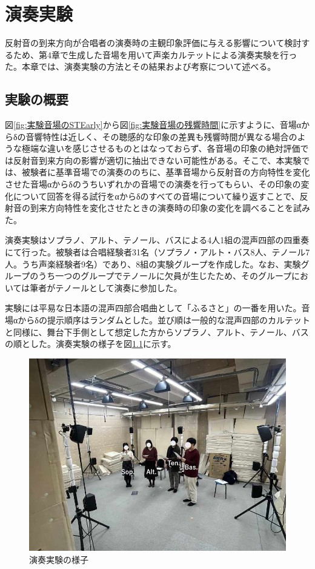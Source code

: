 \documentclass[11pt,a4j]{jreport}
\begin{document}
\chapter{演奏実験}
反射音の到来方向が合唱者の演奏時の主観印象評価に与える影響について検討するため、第4章で生成した音場を用いて声楽カルテットによる演奏実験を行った。本章では、演奏実験の方法とその結果および考察について述べる。

\section{実験の概要}
図\ref{fig:実験音場のSTEarly}から図\ref{fig:実験音場の残響時間}に示すように、音場αからδの音響特性は近しく、その聴感的な印象の差異も残響時間が異なる場合のような極端な違いを感じさせるものとはなっておらず、各音場の印象の絶対評価では反射音到来方向の影響が適切に抽出できない可能性がある。そこで、本実験では、被験者に基準音場での演奏ののちに、基準音場から反射音の方向特性を変化させた音場αからδのうちいずれかの音場での演奏を行ってもらい、その印象の変化について回答を得る試行をαからδのすべての音場について繰り返すことで、反射音の到来方向特性を変化させたときの演奏時の印象の変化を調べることを試みた。

演奏実験はソプラノ、アルト、テノール、バスによる4人1組の混声四部の四重奏にて行った。被験者は合唱経験者31名（ソプラノ・アルト・バス8人、テノール7人。うち声楽経験者9名）であり、8組の実験グループを作成した。なお、実験グループのうち一つのグループでテノールに欠員が生じたため、そのグループにおいては筆者がテノールとして演奏に参加した。

実験には平易な日本語の混声四部合唱曲として「ふるさと」の一番を用いた。音場αからδの提示順序はランダムとした。並び順は一般的な混声四部のカルテットと同様に、舞台下手側として想定した方からソプラノ、アルト、テノール、バスの順とした。演奏実験の様子を図\ref{fig:演奏実験の様子}に示す。


\begin{figure}[H]
  \centering
  \includegraphics[width=0.6\linewidth]{images/subjectiveExp/chorusExpLowQ.jpg}
  \caption{演奏実験の様子}
  \label{fig:演奏実験の様子}
\end{figure}
\end{document}
